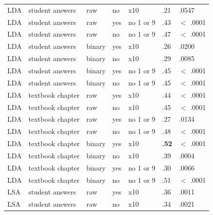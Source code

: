 \documentclass[a4paper,10pt,twoside]{article}
\begin{document}
\begin{table}[h]
\begin{tabular}{lllllll}
		LDA        & student answers    & raw             & no                  & x10               & .21 & .0547       \\
		LDA        & student answers    & raw             & yes                 & no 1 or 9         & .43 & $<$ .0001       \\
		LDA        & student answers    & raw             & no                  & no 1 or 9         & .47 & $<$ .0001       \\
		LDA        & student answers    & binary          & yes                 & x10               & .26 & .0200       \\
		LDA        & student answers    & binary          & no                  & x10               & .29 & .0085       \\
		LDA        & student answers    & binary          & yes                 & no 1 or 9         & .45 & $<$ .0001       \\
		LDA        & student answers    & binary          & no                  & no 1 or 9         & .45 & $<$ .0001       \\
		LDA        & textbook chapter   & raw             & yes                 & x10               & .44 & $<$ .0001       \\
		LDA        & textbook chapter   & raw             & no                  & x10               & .45 & $<$ .0001       \\
		LDA        & textbook chapter   & raw             & yes                 & no 1 or 9         & .27 & .0134       \\
		LDA        & textbook chapter   & raw             & no                  & no 1 or 9         & .48 & $<$ .0001       \\
		LDA        & textbook chapter   & binary          & yes                 & x10               & \textbf{.52} & $<$ .0001       \\
		LDA        & textbook chapter   & binary          & no                  & x10               & .39 & .0004       \\
		LDA        & textbook chapter   & binary          & yes                 & no 1 or 9         & .30 & .0066       \\
		LDA        & textbook chapter   & binary          & no                  & no 1 or 9         & .51 & $<$ .0001       \\
		LSA        & student answers    & raw             & yes                 & x10               & .36 & .0011       \\
		LSA        & student answers    & raw             & no                  & x10               & .34 & .0021       \\

\end{tabular}
\end{table}
\end{document}
